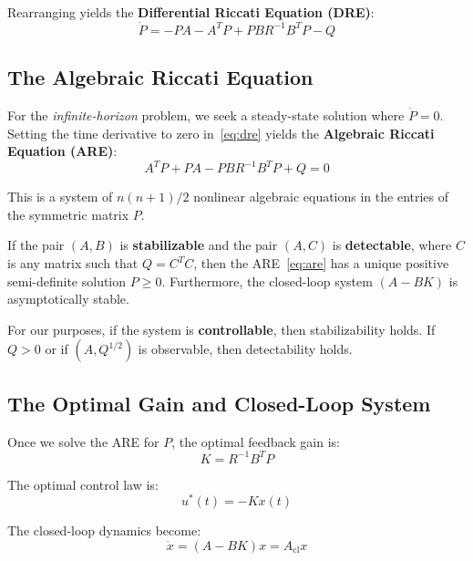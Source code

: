 Rearranging yields the \textbf{Differential Riccati Equation (DRE)}:
\begin{equation}
\boxed{\dot{P} = -PA - A^T P + PBR^{-1}B^T P - Q}
\label{eq:dre}
\end{equation}

\subsection{The Algebraic Riccati Equation}

For the \textit{infinite-horizon} problem, we seek a steady-state solution where $\dot{P} = 0$. Setting the time derivative to zero in~\eqref{eq:dre} yields the \textbf{Algebraic Riccati Equation (ARE)}:
\begin{equation}
\boxed{A^T P + PA - PBR^{-1}B^T P + Q = 0}
\label{eq:are}
\end{equation}

This is a system of $n(n+1)/2$ nonlinear algebraic equations in the entries of the symmetric matrix $P$.

\begin{theorem}
\label{thm:are_existence}
If the pair $(A, B)$ is \textbf{stabilizable} and the pair $(A, C)$ is \textbf{detectable}, where $C$ is any matrix such that $Q = C^T C$, then the ARE~\eqref{eq:are} has a unique positive semi-definite solution $P \geq 0$. Furthermore, the closed-loop system $(A - BK)$ is asymptotically stable.
\end{theorem}

For our purposes, if the system is \textbf{controllable}, then stabilizability holds. If $Q > 0$ or if $(A, Q^{1/2})$ is observable, then detectability holds.

\subsection{The Optimal Gain and Closed-Loop System}

Once we solve the ARE for $P$, the optimal feedback gain is:
\begin{equation}
\boxed{K = R^{-1} B^T P}
\label{eq:lqr_gain}
\end{equation}

The optimal control law is:
\begin{equation}
u^*(t) = -Kx(t)
\end{equation}

The closed-loop dynamics become:
\begin{equation}
\dot{x} = (A - BK)x = A_{\text{cl}} x
\end{equation}

